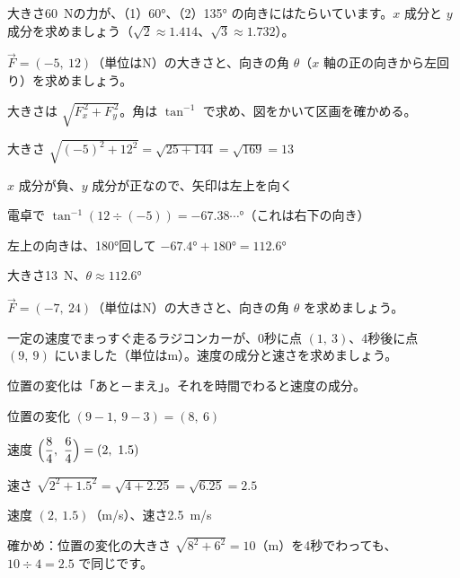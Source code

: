 \begin{jibun}
大きさ\qty{60}{N}の力が、（1）60°、（2）135° の向きにはたらいています。$x$ 成分と $y$ 成分を求めましょう（$\sqrt2\approx1.414$、$\sqrt3\approx1.732$）。
\end{jibun}

\begin{reidai}[成分から大きさと向きを求める]
$\vec{F}=(-5,\ 12)$（単位はN）の大きさと、向きの角 $\theta$（$x$ 軸の正の向きから左回り）を求めましょう。\par
\kangaekata 大きさは $\sqrt{F_x^{\,2}+F_y^{\,2}}$。角は $\tan^{-1}$ で求め、図をかいて区画を確かめる。\par
\shiki 大きさ $\sqrt{(-5)^2+12^2}=\sqrt{25+144}=\sqrt{169}=13$\par
\hspace*{2.6\zw}$x$ 成分が負、$y$ 成分が正なので、矢印は左上を向く\par
\hspace*{2.6\zw}電卓で $\tan^{-1}(12\div(-5))=-67.38\cdots°$（これは右下の向き）\par
\hspace*{2.6\zw}左上の向きは、180°回して $-67.4°+180°=112.6°$\par
\kotae 大きさ\qty{13}{N}、$\theta\approx112.6°$
\end{reidai}

\begin{jibun}
$\vec{F}=(-7,\ 24)$（単位はN）の大きさと、向きの角 $\theta$ を求めましょう。
\end{jibun}

\begin{reidai}[位置の変化から速度の成分を求める]
一定の速度でまっすぐ走るラジコンカーが、0秒に点 $(1,\ 3)$、4秒後に点 $(9,\ 9)$ にいました（単位はm）。速度の成分と速さを求めましょう。\par
\kangaekata 位置の変化は「あと－まえ」。それを時間でわると速度の成分。\par
\shiki 位置の変化 $(9-1,\ 9-3)=(8,\ 6)$\par
\hspace*{2.6\zw}速度 $\Bigl(\dfrac{8}{4},\ \dfrac{6}{4}\Bigr)=(2,\ 1.5)$\par
\hspace*{2.6\zw}速さ $\sqrt{2^2+1.5^2}=\sqrt{4+2.25}=\sqrt{6.25}=2.5$\par
\kotae 速度 $(2,\ 1.5)$（m/s）、速さ\qty{2.5}{m/s}
\end{reidai}
確かめ：位置の変化の大きさ $\sqrt{8^2+6^2}=10$（m）を4秒でわっても、$10\div4=2.5$ で同じです。

